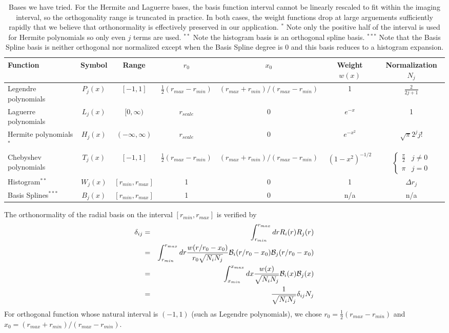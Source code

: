 \documentclass[aps,prl,twocolumn,floatfix,preprintnumbers,showpacs]{revtex4}
\begin{document}
\begin{table}
\begin{tabular}{l|c|c|c|c|c|c}    \hline
    Function                   & Symbol     & Range & $r_{0}$ & $x_{0}$ & Weight $w(x)$  & Normalization $N_{j}$ \\ \hline
    Legendre polynomials       & $P_{j}(x)$ & $[-1,1]$ & $\frac{1}{2}(r_{max}-r_{min})$ & $({r_{max}+r_{min}})/({r_{max}-r_{min}})$ & 1 & $\frac{2}{2j+1}$ \\
    Laguerre polynomials       & $L_{j}(x)$ & $[0,\infty)$ & $r_{scale}$ & 0 & $e^{-x}$  & 1 \\
    Hermite polynomials$^{*}$  & $H_{j}(x)$ & $(-\infty,\infty)$ &$ r_{scale}$ & 0 & $e^{-x^{2}}$&$\sqrt{\pi}2^{j}j!$    \\
    Chebyshev polynomials      & $T_{j}(x)$ & $[-1,1]$ &$\frac{1}{2}(r_{max}-r_{min})$ & $({r_{max}+r_{min}})/({r_{max}-r_{min}})$& $(1-x^{2})^{-1/2}$&$\left\{ 
    \begin{array}{ll}    
    \frac{\pi}{2} & j\ne 0\\
    \pi & j = 0        
    \end{array}\right.$\\ 
    Histogram$^{**}$           & $W_{j}(x)$ & $[r_{min},r_{max}]$ & 1 & 0 & 1 & $\Delta r_{j}$ \\
    Basis Splines$^{***}$      & $B_{j}(x)$ & $[r_{min},r_{max}]$ & 1 & 0 & n/a & n/a \\
\hline
\end{tabular}    
\caption{\label{table::basisfuncs}
Bases we have tried.  For the Hermite and Laguerre bases, the basis function interval cannot be linearly rescaled to fit within the imaging interval, so the orthogonality range is truncated in practice.  In both cases, the weight functions drop at large arguements sufficiently rapidly that we believe that orthonormality is effectively preserved in our application. 
$^{*}$ Note only the positive half of the interval is used for Hermite polynomials so only even $j$ terms are used.
$^{**}$ Note the histogram basis is an orthogonal spline basis. 
$^{***}$ Note that the Basis Spline basis is neither orthogonal nor normalized except when the Basis Spline degree is 0 and this basis reduces to a histogram expansion.        
}    
\end{table}    

The orthonormality of the radial basis on the interval $[r_{min},r_{max}]$ is verified by
\begin{eqnarray*}
    \delta_{ij} & =  & \int_{r_{min}}^{r_{max}} dr R_{i}(r) R_{j}(r) \\
    & = & \int_{r_{min}}^{r_{max}}dr \frac{w(r/r_{0}-x_{0})}{r_{0}\sqrt{N_{i}N_{j}}} {\cal B}_{i}(r/r_{0}-x_{0}) {\cal B}_{j}(r/r_{0}-x_{0})\\
    & = & \int_{x_{min}}^{x_{max}}dx \frac{w(x)}{\sqrt{N_{i}N_{j}}}  {\cal B}_{i}(x) {\cal B}_{j}(x)\\
        & = &  \frac{1}{\sqrt{N_{i}N_{j}}} \delta_{ij}N_{j}
\end{eqnarray*}
For orthogonal function whose natural interval is $(-1,1)$ (such as Legendre polynomials), we chose 
$r_{0}= \frac{1}{2}(r_{max}-r_{min})$ and $x_{0}=({r_{max}+r_{min}})/({r_{max}-r_{min}})$.
\end{document}

